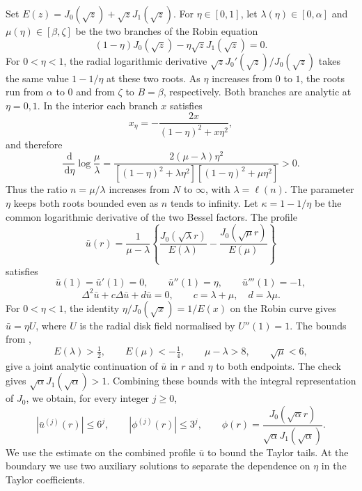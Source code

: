 \documentclass[a4paper,11pt]{amsart}
\numberwithin{equation}{section}
\theoremstyle{plain}
\theoremstyle{definition}
\newcommand{\dd}{\,\mathrm d}
\begin{document}
Set \(E(z)=J_0(\sqrt z)+\sqrt zJ_1(\sqrt z)\).
For \(\eta\in[0,1]\), let \(\lambda(\eta)\in[0,\alpha]\)
and \(\mu(\eta)\in[\beta,\zeta]\) be the two branches of the Robin
equation
\[
 (1-\eta)J_0(\sqrt z)-\eta\sqrt zJ_1(\sqrt z)=0 .
\]
For \(0<\eta<1\), the radial logarithmic derivative
\(\sqrt z J_0'(\sqrt z)/J_0(\sqrt z)\) takes the same value
\(1-1/\eta\) at these two roots. As \(\eta\) increases from \(0\)
to \(1\), the roots run from \(\alpha\) to \(0\) and from \(\zeta\)
to \(B=\beta\), respectively. Both branches are analytic at
\(\eta=0,1\). In the interior each branch \(x\) satisfies
\[
 x_\eta=-\frac{2x}{(1-\eta)^2+x\eta^2},
\]
and therefore
\[
 \frac{\dd}{\dd\eta}\log\frac{\mu}{\lambda}
 =\frac{2(\mu-\lambda)\eta^2}
 {[(1-\eta)^2+\lambda\eta^2][(1-\eta)^2+\mu\eta^2]}>0.
\]
Thus the ratio \(n=\mu/\lambda\) increases from \(N\) to \(\infty\),
with \(\lambda=\ell(n)\). The parameter \(\eta\) keeps both roots
bounded even as \(n\) tends to infinity. Let \(\kappa=1-1/\eta\)
be the common logarithmic derivative of the two Bessel factors.
The profile
\begin{equation}\label{eq:all-profile}
 \bar u(r)=\frac1{\mu-\lambda}
 \left\{\frac{J_0(\sqrt\lambda r)}{E(\lambda)}
       -\frac{J_0(\sqrt\mu r)}{E(\mu)}\right\}
\end{equation}
satisfies
\[
 \bar u(1)=\bar u'(1)=0,\qquad
 \bar u''(1)=\eta,\qquad \bar u'''(1)=-1,
\]
\[
 \Delta^2\bar u+c\Delta\bar u+d\bar u=0,
 \qquad c=\lambda+\mu,\quad d=\lambda\mu.
\]
For \(0<\eta<1\), the identity \(\eta/J_0(\sqrt x)=1/E(x)\)
on the Robin curve gives \(\bar u=\eta U\), where \(U\) is
the radial disk field normalised by \(U''(1)=1\).
The bounds from ,
\[
 E(\lambda)>\tfrac12,\qquad E(\mu)<-\tfrac14,
 \qquad \mu-\lambda>8,\qquad \sqrt\mu<6,
\]
give a joint analytic continuation of \(\bar u\) in \(r\) and
\(\eta\) to both endpoints. The check 
gives \(\sqrt\alpha J_1(\sqrt\alpha)>1\).
Combining these bounds with the integral representation of \(J_0\),
we obtain, for every integer \(j\ge0\),
\begin{equation}\label{eq:all-uniform-derivatives}
 |\bar u^{(j)}(r)|\le6^j,\qquad
 |\phi^{(j)}(r)|\le3^j,
 \qquad
 \phi(r)=\frac{J_0(\sqrt\alpha r)}{\sqrt\alpha J_1(\sqrt\alpha)}.
\end{equation}
We use the estimate on the combined profile \(\bar u\) to bound
the Taylor tails. At the boundary we use two auxiliary solutions
to separate the dependence on \(\eta\) in the Taylor coefficients.
\end{document}
